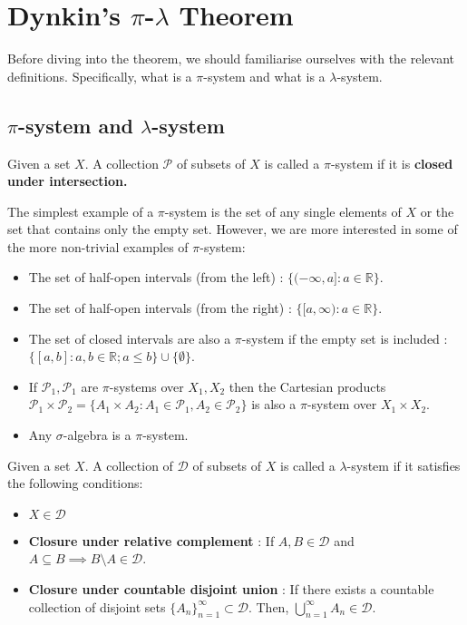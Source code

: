\section{Dynkin's $\pi$-$\lambda$ Theorem}
\noindent Before diving into the theorem, we should familiarise ourselves with the relevant definitions. Specifically, what is a $\pi$-system and what is a $\lambda$-system.

\subsection{$\pi$-system and $\lambda$-system}
\begin{definition}[$\pi$-system]
    Given a set $X$. A collection $\mathcal{P}$ of subsets of $X$ is called a $\pi$-system if it is \bf{closed under intersection}.
\end{definition}

\noindent The simplest example of a $\pi$-system is the set of any single elements of $X$ or the set that contains only the empty set. However, we are more interested in some of the more non-trivial examples of $\pi$-system:

\begin{itemize}
    \item The set of half-open intervals (from the left) : $\{(-\infty, a] : a \in \mathbb{R} \}$.
    \item The set of half-open intervals (from the right) : $\{ [a, \infty) : a \in \mathbb{R} \}$.
    \item The set of closed intervals are also a $\pi$-system if the empty set is included : $\{[a, b] : a, b \in \mathbb{R}; a\le b \} \cup \{ \emptyset \}$.
    \item If $\mathcal{P}_1, \mathcal{P}_1$ are $\pi$-systems over $X_1, X_2$ then the Cartesian products $\mathcal{P}_1\times \mathcal{P}_2 = \{ A_1 \times A_2 : A_1 \in \mathcal{P}_1, A_2 \in \mathcal{P}_2 \}$ is also a $\pi$-system over $X_1 \times X_2$.
    \item Any $\sigma$-algebra is a $\pi$-system.
\end{itemize}

\begin{definition}
    Given a set $X$. A collection of $\mathcal{D}$ of subsets of $X$ is called a $\lambda$-system if it satisfies the following conditions:
    \begin{itemize}
        \item $X \in \mathcal{D}$
        \item \textbf{Closure under relative complement} : If $A, B \in\mathcal{D}$ and $A \subseteq B \implies B \setminus A \in \mathcal{D}$.
        \item \textbf{Closure under countable disjoint union} : If there exists a countable collection of disjoint sets $\{A_n\}_{n=1}^\infty \subset \mathcal{D}$. Then, $\bigcup_{n=1}^\infty A_n \in \mathcal{D}$.
    \end{itemize}
\end{definition}

